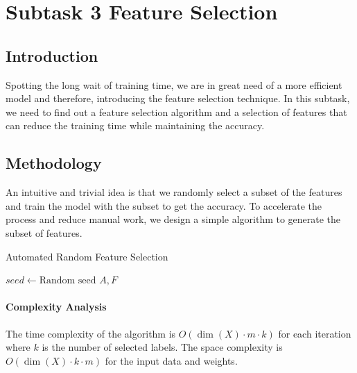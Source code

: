 \documentclass{article}
\begin{document}
\section{Subtask 3 Feature Selection}

\subsection{Introduction}

Spotting the long wait of training time, we are in great need of a more efficient model and therefore, introducing the feature selection technique. In this subtask, we need to find out a feature selection algorithm and a selection of features that can reduce the training time while maintaining the accuracy.

\subsection{Methodology}

An intuitive and trivial idea is that we randomly select a subset of the features and train the model with the subset to get the accuracy. To accelerate the process and reduce manual work, we design a simple algorithm to generate the subset of features.

\begin{algorithm}
\caption{Automated Random Feature Selection}\label{alg:feature-selection}
$seed \leftarrow \text{Random seed}$ \;
\Return $A, F$\;
\end{algorithm}

\paragraph{Complexity Analysis} The time complexity of the algorithm is $O(\dim(X) \cdot m \cdot k)$ for each iteration where $k$ is the number of selected labels. The space complexity is $O(\dim(X) \cdot k \cdot m)$ for the input data and weights.
\end{document}
